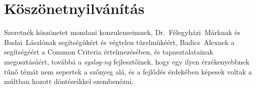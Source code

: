 \chapter*{Köszönetnyilvánítás}

Szeretnék köszönetet mondani konzulenseimnek, \mbox{Dr. Félegyházi Márknak} és \mbox{Budai
Lászlónak} segítségükért és végtelen türelmükéért, \mbox{Badics Alexnek} a segítségéért a Common
Criteria értelmezésében, és tapasztalatainak megosztásáért, továbbá a \emph{syslog-ng}
fejlesztőinek, hogy egy ilyen érzékenyebbnek tűnő témát nem sepertek a szőnyeg alá, és a fejlődés
érdekében képesek voltak a múltban hozott döntéseikkel szembenézni.
